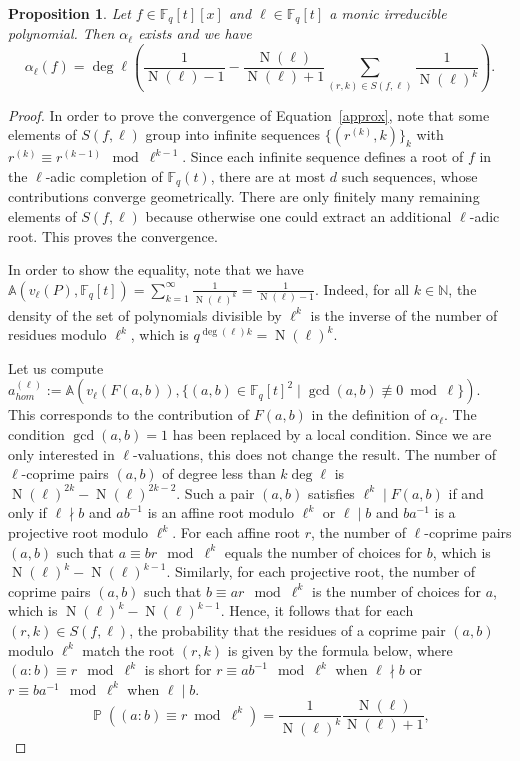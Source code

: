 \documentclass[a4wide]{article}
\newcommand{\F}{{\mathbb F}}
\newcommand{\N}{{\mathbb N}}
\newcommand{\A}{{\mathbb A}}
\DeclareMathOperator{\Prob}{\mathbb{P}}
\DeclareMathOperator{\Norm}{N}
\theoremstyle{plain}
\newtheorem{prop}[theo]{Proposition}
\theoremstyle{definition}
\theoremstyle{remark}
\begin{document}
\begin{prop} \label{ca} Let $f\in\F_q[t][x]$ and $\ell\in\F_q[t]$ a monic irreducible
	polynomial. Then $\alpha_\ell$ exists and we have 
	\begin{equation}\label{approx}
		\alpha_\ell(f)=\deg \ell
		\left(\frac{1}{\Norm(\ell)-1}-\frac{\Norm(\ell)}{\Norm(\ell)+1}\sum_{(r,k)\in
		S(f,\ell)}\frac{1}{\Norm(\ell)^k}\right).
	\end{equation}
\end{prop}
\begin{proof}

    In order to prove the convergence of Equation~\ref{approx}, note that some elements of
	$S(f,\ell)$ group into infinite sequences
	$\{(r^{(k)},k)\}_k$ with $r^{(k)}\equiv
r^{(k-1)}\mod \ell^{k-1}$. Since each infinite sequence defines a root of
$f$ in the $\ell$-adic completion of
$\F_q(t)$, there are at most $d$ such sequences, whose contributions
converge geometrically. There are only finitely
many remaining elements of $S(f,\ell)$ because otherwise one could extract an
additional $\ell$-adic root. This proves the convergence. 

In order to show the equality, note that we have
$\A(v_\ell(P),\F_q[t])=\sum_{k=1}^\infty\frac{1}{\Norm(\ell)^k}=\frac{1}{\Norm(\ell)-1} $.
Indeed, for all $k\in\N$,
the density of the set of polynomials divisible by $\ell^k$ is the inverse
of the number of residues modulo $\ell^k$, which is $q^{\deg(\ell)k}=\Norm(\ell)^k$.

Let us compute $a_{hom}^{(\ell)}:=\A(v_\ell(F(a,b)),\{(a,b)\in \F_q[t]^2\mid
\gcd(a,b)\not\equiv 0 \bmod \ell\})$. This corresponds to the
contribution of $F(a,b)$ in the definition of $\alpha_\ell$. The
condition $\gcd(a,b)=1$ has been replaced by a local condition. Since we
are only interested in $\ell$-valuations, this does not change the
result.
The number of $\ell$-coprime pairs $(a,b)$ of degree less than
$k\deg \ell$ is $\Norm(\ell)^{2k}-\Norm(\ell)^{2k-2}$. Such a pair $(a,b)$
satisfies $\ell^k\mid F(a,b)$ if and only if $\ell\nmid b$ and $ab^{-1}$
is an affine root modulo $\ell^k$ or $\ell\mid b$ and $ba^{-1}$ is a
projective root modulo $\ell^k$.
For each affine root
$r$, the number of $\ell$-coprime pairs $(a,b)$ such that $a\equiv br\mod \ell^k$
equals the number of choices for $b$, which is
$\Norm(\ell)^k-\Norm(\ell)^{k-1}$. Similarly, for each projective root, the
number of coprime pairs $(a,b)$
such that $b\equiv ar\mod \ell^k$ is the number of choices for $a$, which is
$\Norm(\ell)^k-\Norm(\ell)^{k-1}$. Hence, it follows that
for each $(r,k)\in S(f,\ell)$,
the probability that the residues of a coprime pair $(a,b)$ modulo
$\ell^k$ match the root $(r,k)$ is given by the formula below, 
where $(a:b)\equiv r \mod \ell^k$ is short for
$r\equiv ab^{-1}\mod \ell^k$ when $\ell\nmid b$ or $r\equiv ba^{-1}\mod
\ell^k $ when $\ell\mid b$. 
\begin{equation}\label{P(r)}
\Prob((a:b)\equiv r \bmod \ell^k)=
\frac{1}{\Norm(\ell)^k}\frac{\Norm(\ell)}{\Norm(\ell)+1},
\end{equation}


\end{proof}
\end{document}
